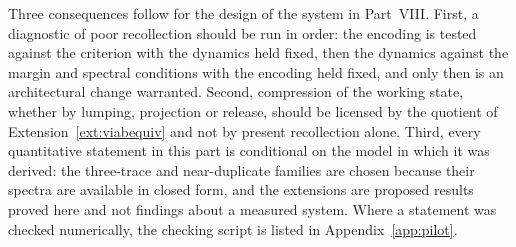 Three consequences follow for the design of the system in Part~VIII. First, a diagnostic of poor recollection should be run in order: the encoding is tested against the criterion with the dynamics held fixed, then the dynamics against the margin and spectral conditions with the encoding held fixed, and only then is an architectural change warranted. Second, compression of the working state, whether by lumping, projection or release, should be licensed by the quotient of Extension~\ref{ext:viabequiv} and not by present recollection alone. Third, every quantitative statement in this part is conditional on the model in which it was derived: the three-trace and near-duplicate families are chosen because their spectra are available in closed form, and the extensions are proposed results proved here and not findings about a measured system. Where a statement was checked numerically, the checking script is listed in Appendix~\ref{app:pilot}.

